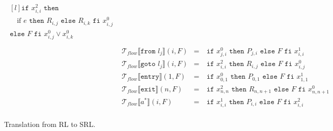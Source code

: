 \begin{figure}[H]
$$\begin{aligned}
      \begin{matrix*}[l]
        \texttt{if }x_{i,i}^2\texttt{ then}\\
        \quad\text{if }e\texttt{ then }R_{i,j}\texttt{ else }R_{i,k}\texttt{ fi }x_{i,j}^0\\
        \texttt{else }F\texttt{ fi }x_{i,j}^0\lor x_{i,k}^0\\
      \end{matrix*}\\
    & \mathcal{T}_{flow}\llbracket\texttt{from }l_j\rrbracket(i,F) & =\ & \texttt{if }x_{j,i}^0\texttt{ then }P_{j,i}\texttt{ else }F\texttt{ fi }x_{i,i}^1\\
    & \mathcal{T}_{flow}\llbracket\texttt{goto }l_j\rrbracket(i,F) & =\ & \texttt{if }x_{i,i}^2\texttt{ then }R_{i,j}\texttt{ else }F\texttt{ fi }x_{i,j}^0\\
    & \mathcal{T}_{flow}\llbracket\texttt{entry}\rrbracket(1,F)    & =\ & \texttt{if }x_{0,1}^0\texttt{ then }P_{0,1}\texttt{ else }F\texttt{ fi }x_{1,1}^1\\
    & \mathcal{T}_{flow}\llbracket\texttt{exit}\rrbracket(n,F)     & =\ & \texttt{if }x_{n,n}^2\texttt{ then }R_{n,n+1}\texttt{ else }F\texttt{ fi }x_{n,n+1}^0\\
    & \mathcal{T}_{flow}\llbracket a^*\rrbracket(i,F)     & =\ & \texttt{if }x_{i,i}^1\texttt{ then }P_{i,i}\texttt{ else }F\texttt{ fi }x_{i,i}^2\\
  \end{aligned}$$
  \caption{Translation from RL to SRL.}
  \label{fig:translation_rl_to_srl}
\end{figure}
